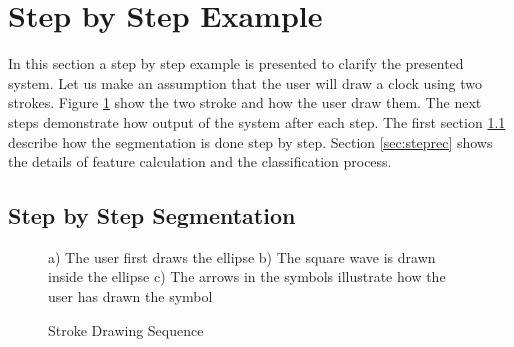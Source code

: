 


\section{Step by Step Example}
\label{secstepExample}
In this section a step by step example is presented to clarify the presented system. Let us make an assumption that the user will draw a clock using two strokes. Figure \ref{fig:clock} show the two stroke and how the user draw them. The next steps demonstrate how output of the system after each step. The first section \ref{sec:stepseg} describe how the segmentation is done step by step. Section \ref{sec:steprec} shows the details of feature calculation and the classification process. 

\subsection{Step by Step Segmentation}
\label{sec:stepseg}


\begin{figure}
	\centering
		
		
	\caption{Stroke Drawing Sequence} a) The user first draws the ellipse b) The square wave is drawn inside the ellipse c) The arrows in the symbols illustrate how the user has drawn the symbol
	\label{fig:clock}
\end{figure}

